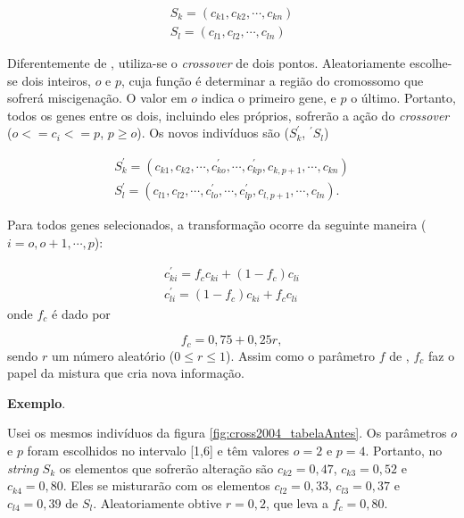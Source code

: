 	\begin{equation}
		\begin{array}{l}
		S_k = (c_{k1}, c_{k2}, \cdots, c_{kn})	\\
		S_l = (c_{l1}, c_{l2}, \cdots, c_{ln})	
		\end{array}
	\end{equation}
	
	Diferentemente de \cite{metodo2004}, utiliza-se o \emph{crossover} de dois pontos. Aleatoriamente escolhe-se dois inteiros, $o$ e $p$, cuja função é determinar a região do cromossomo que sofrerá miscigenação. O valor em $o$ indica o primeiro gene, e $p$ o último. Portanto, todos os genes entre os dois, incluindo eles próprios, sofrerão a ação do \emph{crossover} ($o <= c_i <= p$, $p \geq o$). Os novos indivíduos são ($S^{'}_k$, $^{'}S_l$)
	
	\begin{equation}
		\begin{array}{l}
			S^{'}_k = (c_{k1}, c_{k2}, \cdots, c^{'}_{ko}, \cdots , c^{'}_{kp}, c_{k,p+1}, \cdots, c_{kn})	\\
			S^{'}_l = (c_{l1}, c_{l2}, \cdots, c^{'}_{lo}, \cdots , c^{'}_{lp}, c_{l,p+1}, \cdots, c_{ln}).	
		\end{array}
	\end{equation}
	
	Para todos genes selecionados, a transformação ocorre da seguinte maneira ($i = o, o + 1, \cdots, p$):
	
	\begin{equation}
		\begin{array}{l}
			c^{'}_{ki} = f_c c_{ki} + (1 - f_c) c_{li}     \\
			c^{'}_{li} = (1 - f_c) c_{ki} + f_c c_{li}
		\end{array}
	\end{equation}
	onde $f_c$ é dado por
	
	\begin{equation}
		f_c = 0,75 + 0,25r,
	\end{equation}
	sendo $r$ um número aleatório ($0 \leq r \leq 1$). Assim como o parâmetro $f$ de \cite{metodo2004}, $f_c$ faz o papel da mistura que cria nova informação.
	
	\textbf{Exemplo}.
	
	
	Usei os mesmos indivíduos da figura \ref{fig:cross2004_tabelaAntes}. Os parâmetros $o$ e $p$ foram escolhidos no intervalo [1,6] e têm valores $o = 2$ e $p = 4$. Portanto, no \emph{string} $S_k$ os elementos que sofrerão alteração são $c_{k2} = 0,47$, $c_{k3} = 0,52$ e $c_{k4} = 0,80$. Eles se misturarão com os elementos $c_{l2} = 0,33$, $c_{l3} = 0,37$ e $c_{l4} = 0,39$ de $S_l$. Aleatoriamente obtive $r = 0,2$, que leva a $f_c = 0,80$.
	
